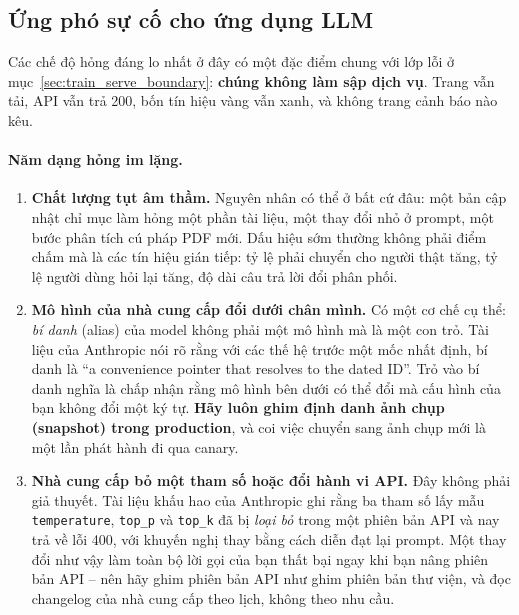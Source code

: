 \subsection{Ứng phó sự cố cho ứng dụng LLM}
\label{ssec:llm_incident}

Các chế độ hỏng đáng lo nhất ở đây có một đặc điểm chung với lớp lỗi ở mục~\ref{sec:train_serve_boundary}: \textbf{chúng không làm sập dịch vụ}. Trang vẫn tải, API vẫn trả 200, bốn tín hiệu vàng vẫn xanh, và không trang cảnh báo nào kêu.

\paragraph{Năm dạng hỏng im lặng.}

\begin{enumerate}
	\item \textbf{Chất lượng tụt âm thầm.} Nguyên nhân có thể ở bất cứ đâu: một bản cập nhật chỉ mục làm hỏng một phần tài liệu, một thay đổi nhỏ ở prompt, một bước phân tích cú pháp PDF mới. Dấu hiệu sớm thường không phải điểm chấm mà là các tín hiệu gián tiếp: tỷ lệ phải chuyển cho người thật tăng, tỷ lệ người dùng hỏi lại tăng, độ dài câu trả lời đổi phân phối.
	\item \textbf{Mô hình của nhà cung cấp đổi dưới chân mình.} Có một cơ chế cụ thể: \emph{bí danh} (alias) của model không phải một mô hình mà là một con trỏ. Tài liệu của Anthropic nói rõ rằng với các thế hệ trước một mốc nhất định, bí danh là ``a convenience pointer that resolves to the dated ID''. Trỏ vào bí danh nghĩa là chấp nhận rằng mô hình bên dưới có thể đổi mà cấu hình của bạn không đổi một ký tự. \textbf{Hãy luôn ghim định danh ảnh chụp (snapshot) trong production}, và coi việc chuyển sang ảnh chụp mới là một lần phát hành đi qua canary.
	\item \textbf{Nhà cung cấp bỏ một tham số hoặc đổi hành vi API.} Đây không phải giả thuyết. Tài liệu khấu hao của Anthropic ghi rằng ba tham số lấy mẫu \texttt{temperature}, \texttt{top\_p} và \texttt{top\_k} đã bị \emph{loại bỏ} trong một phiên bản API và nay trả về lỗi 400, với khuyến nghị thay bằng cách diễn đạt lại prompt. Một thay đổi như vậy làm toàn bộ lời gọi của bạn thất bại ngay khi bạn nâng phiên bản API -- nên hãy ghim phiên bản API như ghim phiên bản thư viện, và đọc changelog của nhà cung cấp theo lịch, không theo nhu cầu.

\end{enumerate}
